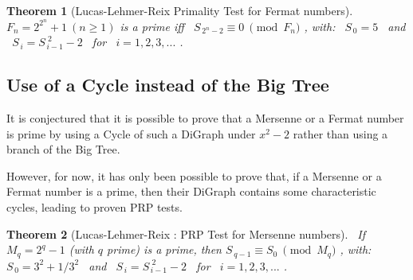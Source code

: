 \documentclass[latin1]{quadrature}
\newcommand{\PMod}[1]{\!\!\pmod{#1}}
\newtheorem{theorem}{Theorem}
\newif\ifenfrancais
\begin{document}
\begin{article}
\begin{article}
\ifenfrancais
\begin{theorem}[Lucas-Lehmer-Reix : Test de Primalit\'e pour les nombres de Fermat]
\ 
\newline
$F_n = 2^{2^n}+1 \ (n \geq 1)$ est premier ssi \ $S_{\,2^n-2} \equiv 0 \ \PMod{F_n}$ ,
avec : \ $S_{\,0} = 5$ \ et \ $S_{\,i} = S_{\,i-1}^{\,\,2} - 2$ \ pour \ $i=1,2,3, ...$ .
\end{theorem}
\else
\begin{theorem}[Lucas-Lehmer-Reix Primality Test for Fermat numbers]
\ 
\newline
$F_n = 2^{2^n}+1 \ (n \geq 1)$ is a prime iff \ $S_{\,2^n-2} \equiv 0 \ \PMod{F_n}$ ,
with: \ $S_{\,0} = 5$ \ and \ $S_{\,i} = S_{\,i-1}^{\,\,2} - 2$ \ for \ $i=1,2,3, ...$ .
\end{theorem}
\fi

\ifenfrancais
\subsection{ Utilisation d'un Cycle \`a la place de l'Arbre G\'eant }
\else
\subsection{ Use of a Cycle instead of the Big Tree }
\fi

\ifenfrancais
On conjecture qu'il est possible de prouver qu'un nombre de Mersenne ou de Fermat est premier en utilisant un Cycle du DiGraph sous $x^2-2$ plut\^ot qu'en utilisant une branche de l'Arbre G\'eant du DiGraph.

Pour le moment, il a \'et\'e uniquement possible de prouver que, si un nombre de Mersenne ou de Fermat est premier, alors son DiGraph pr\'esente des Cycles particuliers qui permettent de g\'en\'erer des tests PRP.
\else
It is conjectured that it is possible to prove that a Mersenne or a Fermat number is prime by using a Cycle of such a DiGraph under $x^2-2$ rather than using a branch of the Big Tree.

However, for now, it has only been possible to prove that, if a Mersenne or a Fermat number is a prime, then their DiGraph contains some characteristic cycles, leading to proven PRP tests.
\fi

\ifenfrancais
\begin{theorem}[Lucas-Lehmer-Reix : PRP Test pour les nombres de Mersenne]
\ 
Si $M_q = 2^q-1$ (avec $q$ premier) est premier, alors $S_{\,q-1} \equiv S_0 \ \PMod{M_q}$ ,
avec : \ $S_{\,0} = 3^2+1/3^2$ \ et \ $S_{\,i} = S_{\,i-1}^{\,\,2} - 2$ \ pour \ $i=1,2,3, ...$ .
\end{theorem}
\else
\begin{theorem}[Lucas-Lehmer-Reix : PRP Test for Mersenne numbers]
\ 
If $M_q = 2^q-1$ (with $q$ prime) is a prime, then $S_{\,q-1} \equiv S_0 \ \PMod{M_q}$ ,
with: \ $S_{\,0} = 3^2+1/3^2$ \ and \ $S_{\,i} = S_{\,i-1}^{\,\,2} - 2$ \ for \ $i=1,2,3, ...$ .
\end{theorem}
\fi


\end{article}
\end{article}
\end{document}
